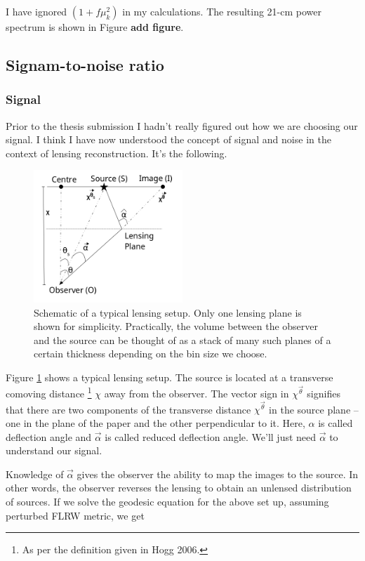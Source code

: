 \documentclass[12pt,a4paper]{article}
\begin{document}
I have ignored $ (1 + f\mu_k^2) $ in my calculations. The resulting 21-cm power spectrum is shown in Figure \textbf{add figure}.


\subsection{Signam-to-noise ratio}
\subsubsection{Signal}
Prior to the thesis submission I hadn't really figured out how we are choosing our signal. I think I have now understood the concept of signal and noise in the context of lensing reconstruction. It's the following.

\begin{figure}[tbp]
	\centering
	\includegraphics[width = 0.5\textwidth]{lensing_schematic}
	\caption{Schematic of a typical lensing setup. Only one lensing plane is shown for simplicity. Practically, the volume between the observer and the source can be thought of as a stack of many such planes of a certain thickness depending on the bin size we choose.}
	\label{fig:lensing_schematic}
\end{figure}

Figure \ref{fig:lensing_schematic} shows a typical lensing setup. The source is located at a transverse comoving distance \footnote{As per the definition given in Hogg 2006.} $ \chi $ away from the observer. The vector sign in $ \chi^{\vec{\theta}} $ signifies that there are two components of the transverse distance $ \chi^{\vec{\theta}} $ in the source plane -- one in the plane of the paper and the other perpendicular to it. Here, $ \hat{\alpha} $ is called deflection angle and $ \vec{\alpha} $ is called reduced deflection angle. We'll just need $ \vec{\alpha} $ to understand our signal.

Knowledge of $ \vec{\alpha} $ gives the observer the ability to map the images to the source. In other words, the observer reverses the lensing to obtain an unlensed distribution of sources. If we solve the  geodesic equation for the above set up, assuming perturbed FLRW metric, we get
\end{document}
